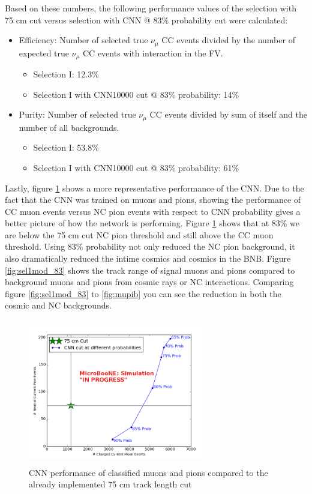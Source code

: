 Based on these numbers, the following performance values of the selection with 75 cm cut versus selection with CNN @ 83\% probability cut were calculated:
\begin{itemize}
\item Efficiency: Number of selected true $\nu_{\mu}$ CC events divided by the number of expected true $\nu_{\mu}$ CC events with interaction in the FV.
\begin{itemize}
\item Selection I: 12.3\% 
\item Selection I with CNN10000 cut @ 83\% probability: 14\% 
\end{itemize}
\item Purity: Number of selected true $\nu_{\mu}$ CC events divided by sum of itself and the number of all backgrounds.
\begin{itemize}
\item Selection I: 53.8\% 
\item Selection I with CNN10000 cut @ 83\% probability: 61\% 
\end{itemize}
\end{itemize}

Lastly, figure \ref{fig:sel1mod_cnnperformance} shows a more representative performance of the CNN. Due to the fact that the CNN was trained on muons and pions, showing the performance of CC muon events versus NC pion events with respect to CNN probability gives a better picture of how the network is performing. Figure \ref{fig:sel1mod_cnnperformance} shows that at 83\% we are below the 75 cm cut NC pion threshold and still above the CC muon threshold. Using 83\% probability not only reduced the NC pion background, it also dramatically reduced the intime cosmics and cosmics in the BNB. Figure \ref{fig:sel1mod_83} shows the track range of signal muons and pions compared to background muons and pions from cosmic rays or NC interactions. Comparing figure \ref{fig:sel1mod_83} to \ref{fig:mupib} you can see the reduction in both the cosmic and NC backgrounds.  

\begin{figure}[htp!]
\centering
\includegraphics[width=3in,height=2.5in]{figs/cnn_performance.png}
\caption{CNN performance of classified muons and pions compared to the already implemented 75 cm track length cut}
\label{fig:sel1mod_cnnperformance}
\end{figure}

